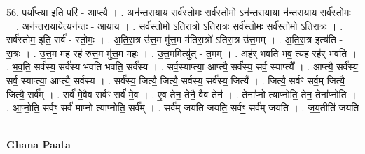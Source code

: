 \documentclass[17pt]{extarticle}
\begin{document}
56. पर्या᳚प्त्या॒ इति॒ परि॑ - आ॒प्त्यै॒ । . अन॑न्तरायाय॒ सर्व॑स्तोमः॒ सर्व॑स्तो॒मो ऽन॑न्तराया॒या न॑न्तरायाय॒ सर्व॑स्तोमः । . अन॑न्तराया॒येत्यन॑न्तः - आ॒या॒य॒ । . सर्व॑स्तोमो ऽतिरा॒त्रो॑ ऽतिरा॒त्रः सर्व॑स्तोमः॒ सर्व॑स्तोमो ऽतिरा॒त्रः । . सर्व॑स्तोम॒ इति॒ सर्व॑ - स्तो॒मः॒ । . अ॒ति॒रा॒त्र उ॑त्त॒म मु॑त्त॒म म॑तिरा॒त्रो॑ ऽतिरा॒त्र उ॑त्त॒मम् । . अ॒ति॒रा॒त्र इत्य॑ति - रा॒त्रः । . उ॒त्त॒म मह॒ रह॑ रुत्त॒म मु॑त्त॒म महः॑ । . उ॒त्त॒ममित्यु॑त् - त॒मम् । . अह॑र् भवति भव॒ त्यह॒ रह॑र् भवति । . भ॒व॒ति॒ सर्व॑स्य॒ सर्व॑स्य भवति भवति॒ सर्व॑स्य । . सर्व॒स्याप्त्या॒ आप्त्यै॒ सर्व॑स्य॒ सर्व॒ स्याप्त्यै᳚ । . आप्त्यै॒ सर्व॑स्य॒ सर्व॒ स्याप्त्या॒ आप्त्यै॒ सर्व॑स्य । . सर्व॑स्य॒ जित्यै॒ जित्यै॒ सर्व॑स्य॒ सर्व॑स्य॒ जित्यै᳚ । . जित्यै॒ सर्वꣳ॒॒ सर्व॒म् जित्यै॒ जित्यै॒ सर्व᳚म् । . सर्व॑ मे॒वैव सर्वꣳ॒॒ सर्व॑ मे॒व । . ए॒व तेन॒ तेनै॒ वैव तेन॑ । . तेना᳚प्नो त्याप्नोति॒ तेन॒ तेना᳚प्नोति । . आ॒प्नो॒ति॒ सर्वꣳ॒॒ सर्व॑ माप्नो त्याप्नोति॒ सर्व᳚म् । . सर्व॑म् जयति जयति॒ सर्वꣳ॒॒ सर्व॑म् जयति । . ज॒य॒तीति॑ जयति । \newline

\textbf{Ghana Paata } \newline
\end{document}

